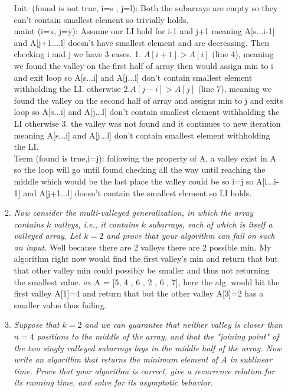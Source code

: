 \documentclass[12pt]{article}
\begin{document}
\begin{enumerate}
\begin{enumerate}
Init: (found is not true, i=s , j=l): Both the subarrays are empty so they can't contain smallest element so trivially holds.\\

maint (i=x, j=y): Assume our LI hold for i-1 and j+1 meaning A[s...i-1] and A[j+1....l] doesn't have smallest element and are decreasing. Then checking i and j we have 3 cases. 1. $A[i+1] > A[i]$ (line 4), meaning we found the valley on the first half of array then would assign min to i and exit loop so A[s...i] and A[j...l] don't contain smallest element withholding the LI. otherwise 2.$ A[j-i]>A[j]$ (line 7), meaning we found the valley on the second half of array and assigns min to j and exits loop so A[s...i] and A[j...l] don't contain smallest element withholding the LI otherwise 3. the valley was not found and it continues to new iteration meaning A[s...i] and A[j...l] don't contain smallest element withholding the LI. \\

Term (found is true,i=j): following the property of A, a valley exist in A so the loop will go until found checking all the way until reaching the middle which would be the last place the valley could be so i=j so A[l...i-1] and A[j+1...l] doesn't contain the smallest element so LI holds.

        \item \textit{Now consider the multi-valleyed generalization, in which the array contains $k$ valleys, i.e., it contains $k$ subarrays, each of which is itself a valleyed array. Let $k = 2$ and prove that your algorithm can fail on such an input.}
Well because there are 2 valleys there are 2 possible min. My algorithm right now would find the first valley's min and return that but that other valley min could possibly be smaller and thus not returning the smallest value. ex A = [5, 4 , 6 , 2 , 6 , 7], here the alg. would hit the first valley A[1]=4 and return that but the other valley A[3]=2 has a smaller value thus failing.

        \item \textit{Suppose that $k = 2$ and we can guarantee that neither valley is closer than $n=4$ positions to the middle of the array, and that the "joining point" of the two singly valleyed subarrays lays in the middle half of the array. Now write an algorithm that returns the minimum element of $A$ in sublinear time. Prove that your algorithm is correct, give a recurrence relation for its running time, and solve for its asymptotic behavior.}


\end{enumerate}
\end{enumerate}
\end{document}
